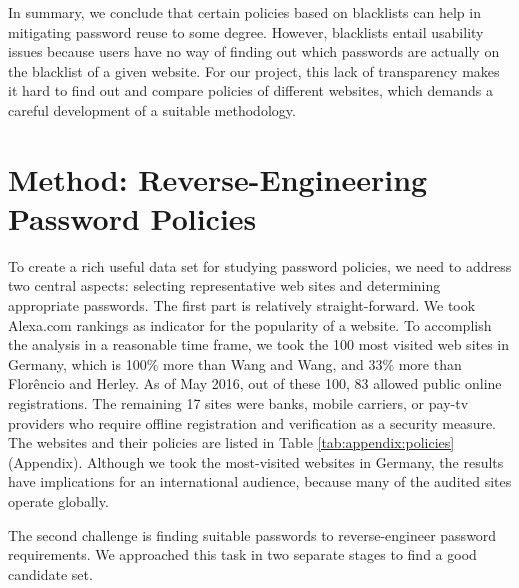 In summary, we conclude that certain policies based on blacklists can help in mitigating password reuse to some degree. However, blacklists entail usability issues because users have no way of finding out which passwords are actually on the blacklist of a given website. For our project, this lack of transparency makes it hard to find out and compare policies of different websites, which demands a careful development of a suitable methodology.

\section{Method: Reverse-Engineering Password Policies}
To create a rich useful data set for studying password policies, we need to address two central aspects: selecting representative web sites and determining appropriate passwords. The first part is relatively straight-forward. We took Alexa.com rankings as indicator for the popularity of a website. To accomplish the analysis in a reasonable time frame, we took the 100 most visited web sites in Germany, which is 100\% more than Wang and Wang, and 33\% more than Florêncio and Herley. As of May 2016, out of these 100, 83 allowed public online registrations. The remaining 17 sites were banks, mobile carriers, or pay-tv providers who require offline registration and verification as a security measure. The websites and their policies are listed in Table \ref{tab:appendix:policies} (Appendix). Although we took the most-visited websites in Germany, the results have implications for an international audience, because many of the audited sites operate globally.

The second challenge is finding suitable passwords to reverse-engineer password requirements. We approached this task in two separate stages to find a good candidate set. 

